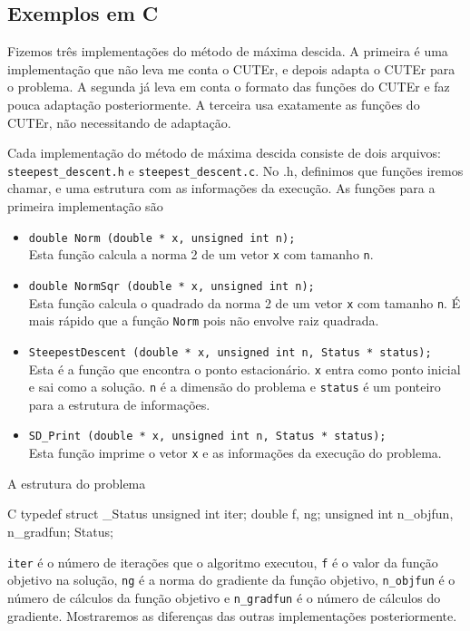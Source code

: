 \documentclass[letterpaper,11pt]{article}
\numberwithin{equation}{section}
\begin{document}
\subsection{Exemplos em C}

Fizemos três implementações do método de máxima descida. A primeira é uma implementação
que não leva me conta o CUTEr, e depois adapta o CUTEr para o problema. A segunda já leva
em conta o formato das funções do CUTEr e faz pouca adaptação posteriormente. A terceira
usa exatamente as funções do CUTEr, não necessitando de adaptação.

Cada implementação do método de máxima descida consiste de dois arquivos:
\verb+steepest_descent.h+ e \verb+steepest_descent.c+. No .h, definimos que funções
iremos chamar, e uma estrutura com as informações da execução. As funções para a 
primeira implementação são
\begin{itemize}
 \item \verb+double Norm (double * x, unsigned int n);+ \\
Esta função calcula a norma 2 de um vetor \verb+x+ com tamanho \verb+n+.
 \item \verb+double NormSqr (double * x, unsigned int n);+ \\
Esta função calcula o quadrado da norma 2 de um vetor \verb+x+ com tamanho \verb+n+. É mais
rápido que a função \verb+Norm+ pois não envolve raiz quadrada.
 \item \verb+SteepestDescent (double * x, unsigned int n, Status * status);+ \\
Esta é a função que encontra o ponto estacionário. \verb+x+ entra como ponto inicial e 
sai como a solução. \verb+n+ é a dimensão do problema e \verb+status+ é um ponteiro para
a estrutura de informações.
 \item \verb+SD_Print (double * x, unsigned int n, Status * status);+ \\
Esta função imprime o vetor \verb+x+ e as informações da execução do problema.
\end{itemize}
A estrutura do problema
\begin{code}{C}
typedef struct _Status {
  unsigned int iter;
  double f, ng;
  unsigned int n_objfun, n_gradfun;
} Status;
\end{code}
\verb+iter+ é o número de iterações que o algoritmo executou, \verb+f+ é o valor da
função objetivo na solução, \verb+ng+ é a norma do gradiente da função objetivo,
\verb+n_objfun+ é o número de cálculos da função objetivo e \verb+n_gradfun+ é o número
de cálculos do gradiente. Mostraremos as diferenças das outras implementações posteriormente.
\end{document}
